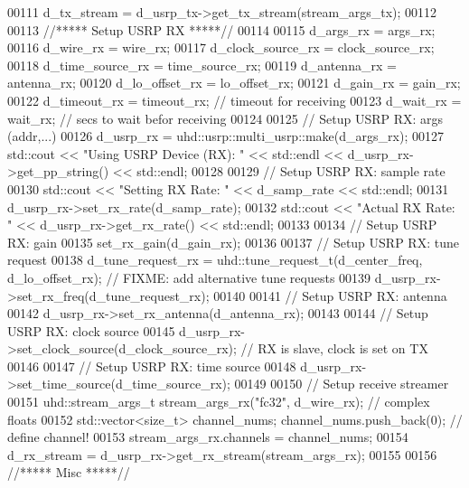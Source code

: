\begin{DoxyCode}
00111         d_tx_stream = d_usrp_tx->get\_tx\_stream(stream\_args\_tx);
00112 
00113         \textcolor{comment}{//***** Setup USRP RX *****//}
00114 
00115         d_args_rx = args\_rx;
00116         d_wire_rx = wire\_rx;
00117         d_clock_source_rx = clock\_source\_rx;
00118         d_time_source_rx = time\_source\_rx;
00119         d_antenna_rx = antenna\_rx;
00120         d_lo_offset_rx = lo\_offset\_rx;
00121         d_gain_rx = gain\_rx;
00122         d_timeout_rx = timeout\_rx; \textcolor{comment}{// timeout for receiving}
00123         d_wait_rx = wait\_rx; \textcolor{comment}{// secs to wait befor receiving}
00124 
00125         \textcolor{comment}{// Setup USRP RX: args (addr,...)}
00126         d_usrp_rx = uhd::usrp::multi\_usrp::make(d_args_rx);
00127         std::cout << \textcolor{stringliteral}{"Using USRP Device (RX): "} << std::endl << d_usrp_rx->get\_pp\_string() << std::endl;
00128 
00129         \textcolor{comment}{// Setup USRP RX: sample rate}
00130         std::cout << \textcolor{stringliteral}{"Setting RX Rate: "} << d_samp_rate << std::endl;
00131         d_usrp_rx->set\_rx\_rate(d_samp_rate);
00132         std::cout << \textcolor{stringliteral}{"Actual RX Rate: "} << d_usrp_rx->get\_rx\_rate() << std::endl;
00133 
00134         \textcolor{comment}{// Setup USRP RX: gain}
00135         set_rx_gain(d_gain_rx);
00136 
00137         \textcolor{comment}{// Setup USRP RX: tune request}
00138         d_tune_request_rx = uhd::tune\_request\_t(d_center_freq, d_lo_offset_rx); \textcolor{comment}{// FIXME: add alternative
       tune requests}
00139         d_usrp_rx->set\_rx\_freq(d_tune_request_rx);
00140 
00141         \textcolor{comment}{// Setup USRP RX: antenna}
00142         d_usrp_rx->set\_rx\_antenna(d_antenna_rx);
00143 
00144         \textcolor{comment}{// Setup USRP RX: clock source}
00145         d_usrp_rx->set\_clock\_source(d_clock_source_rx); \textcolor{comment}{// RX is slave, clock is set on TX}
00146 
00147         \textcolor{comment}{// Setup USRP RX: time source}
00148         d_usrp_rx->set\_time\_source(d_time_source_rx);
00149 
00150         \textcolor{comment}{// Setup receive streamer}
00151         uhd::stream\_args\_t stream\_args\_rx(\textcolor{stringliteral}{"fc32"}, d_wire_rx); \textcolor{comment}{// complex floats}
00152         std::vector<size\_t> channel\_nums; channel\_nums.push\_back(0); \textcolor{comment}{// define channel!}
00153         stream\_args\_rx.channels = channel\_nums;
00154         d_rx_stream = d_usrp_rx->get\_rx\_stream(stream\_args\_rx);
00155 
00156         \textcolor{comment}{//***** Misc *****//}

\end{DoxyCode}
